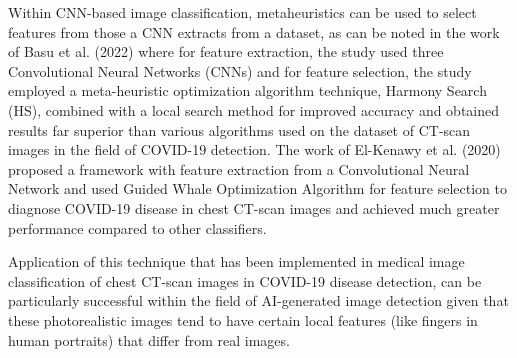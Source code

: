 Within CNN-based image classification, metaheuristics can be used to select features from those a CNN extracts from a dataset, as can be noted in the work of Basu et al. (2022) \cite{14} where for feature extraction, the study used three Convolutional Neural Networks (CNNs) and for feature selection, the study employed a meta-heuristic optimization algorithm technique, Harmony Search (HS), combined with a local search method for improved accuracy and obtained results far superior than various algorithms used on the dataset of CT-scan images in the field of COVID-19 detection. The work of El-Kenawy et al. (2020)  \cite{15} proposed a framework with feature extraction from a Convolutional Neural Network and used Guided Whale Optimization Algorithm for feature selection to diagnose COVID-19 disease in chest CT-scan images and achieved much greater performance compared to other classifiers.



Application of this technique that has been implemented in medical image classification of chest CT-scan images in COVID-19 disease detection, can be particularly successful within the field of AI-generated image detection given that these photorealistic images tend to have certain local features (like fingers in human portraits) that differ from real images.  
